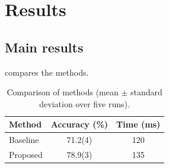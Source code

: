 \chapter{Results}\label{ch:results}


\section{Main results}\label{sec:main-results}

 compares the methods.

\begin{table}[htbp]
  \centering
  \caption{Comparison of methods (mean $\pm$ standard deviation over five runs).}
  \label{tab:results}
  \begin{tabular}{l S[table-format=2.1(1), uncertainty-mode=separate] S[table-format=3.0]}
    \toprule
    {Method} & {Accuracy (\%)} & {Time (\unit{\milli\second})} \\
    \midrule
    Baseline & 71.2(4) & 120 \\
    Proposed & 78.9(3) & 135 \\
    \bottomrule
  \end{tabular}
\end{table}
